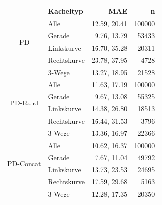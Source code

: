 \begin{tabular}[t]{|c|l|r|r|}
	\hline
	 & \textbf{Kacheltyp} & \textbf{MAE} & \textbf{n} \\
	\hline
	\multirow{4}{*}{PD} 
	& Alle
	& 12.59, 20.41
	& 100000\\
	\cline{2-4}
	& Gerade
	&  9.76, 13.79
	& 53433\\
	\cline{2-4}
	& Linkskurve
	& 16.70,  35.28
	& 20311\\
	\cline{2-4}
	& Rechtskurve
	& 23.78, 37.95 
	& 4728\\
	\cline{2-4}
	& 3-Wege
	&  13.27, 18.95
	& 21528\\
	\hline
	\multirow{4}{*}{PD-Rand} 
	& Alle
	& 11.63, 17.19
	& 100000\\
	\cline{2-4}
	& Gerade
	&  9.67, 13.08
	& 55325\\
	\cline{2-4}
	& Linkskurve
	& 14.38, 26.80
	& 18513\\
	\cline{2-4}
	& Rechtskurve
	& 16.44, 31.53
	& 3796\\
	\cline{2-4}
	& 3-Wege
	& 13.36, 16.97
	& 22366\\
	\hline
	\multirow{4}{*}{PD-Concat} 
	& Alle
	& 10.62, 16.37
	& 100000\\
	\cline{2-4}
	& Gerade
	& 7.67, 11.04
	& 49792\\
	\cline{2-4}
	& Linkskurve
	& 13.73, 23.53
	& 24695\\
	\cline{2-4}
	& Rechtskurve
	& 17.59, 29.68
	& 5163\\
	\cline{2-4}
	& 3-Wege
	& 12.28, 17.35
	& 20350\\
	\hline
\end{tabular}
